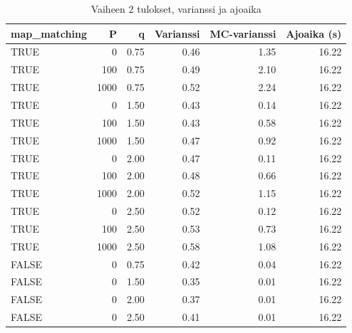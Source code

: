 \documentclass[
  12pt,
  a4paper, twoside]{book}
\begin{document}
\begin{table}

\caption{\label{tab:vaihe-2-tulokset-varianssi}Vaiheen 2 tulokset, varianssi ja ajoaika}
\centering
\begin{tabular}[t]{lrrrrr}
\toprule
map\_matching & P & q & Varianssi & MC-varianssi & Ajoaika (s)\\
\midrule
TRUE & 0 & 0.75 & 0.46 & 1.35 & 16.22\\
TRUE & 100 & 0.75 & 0.49 & 2.10 & 16.22\\
TRUE & 1000 & 0.75 & 0.52 & 2.24 & 16.22\\
TRUE & 0 & 1.50 & 0.43 & 0.14 & 16.22\\
TRUE & 100 & 1.50 & 0.43 & 0.58 & 16.22\\
\addlinespace
TRUE & 1000 & 1.50 & 0.47 & 0.92 & 16.22\\
TRUE & 0 & 2.00 & 0.47 & 0.11 & 16.22\\
TRUE & 100 & 2.00 & 0.48 & 0.66 & 16.22\\
TRUE & 1000 & 2.00 & 0.52 & 1.15 & 16.22\\
TRUE & 0 & 2.50 & 0.52 & 0.12 & 16.22\\
\addlinespace
TRUE & 100 & 2.50 & 0.53 & 0.73 & 16.22\\
TRUE & 1000 & 2.50 & 0.58 & 1.08 & 16.22\\
FALSE & 0 & 0.75 & 0.42 & 0.04 & 16.22\\
FALSE & 0 & 1.50 & 0.35 & 0.01 & 16.22\\
FALSE & 0 & 2.00 & 0.37 & 0.01 & 16.22\\
\addlinespace
FALSE & 0 & 2.50 & 0.41 & 0.01 & 16.22\\
\bottomrule
\end{tabular}
\end{table}
\end{document}
